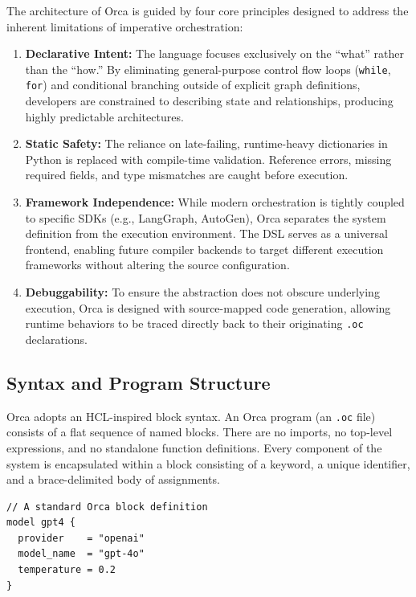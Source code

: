 \documentclass[sigconf,nonacm]{acmart}
\begin{document}
The architecture of Orca is guided by four core principles designed to
address the inherent limitations of imperative orchestration:
\begin{enumerate}[leftmargin=*]
  \item \textbf{Declarative Intent:} The language focuses exclusively on the
        ``what'' rather than the ``how.'' By eliminating general-purpose
        control flow loops (\texttt{while}, \texttt{for}) and conditional
        branching outside of explicit graph definitions, developers are
        constrained to describing state and relationships, producing highly
        predictable architectures.
  \item \textbf{Static Safety:} The reliance on late-failing,
        runtime-heavy dictionaries in Python is replaced with compile-time
        validation. Reference errors, missing required fields, and type
        mismatches are caught before execution.
  \item \textbf{Framework Independence:} While modern orchestration is
        tightly coupled to specific SDKs (e.g., LangGraph, AutoGen), Orca
        separates the system definition from the execution environment. The DSL
        serves as a universal frontend, enabling future compiler backends to
        target different execution frameworks without altering the source
        configuration.
  \item \textbf{Debuggability:} To ensure the abstraction does not obscure
        underlying execution, Orca is designed with source-mapped code
        generation, allowing runtime behaviors to be traced directly back to
        their originating \texttt{.oc} declarations.
\end{enumerate}

\subsection{Syntax and Program Structure}
\label{sec:design:syntax}

Orca adopts an HCL-inspired block syntax. An Orca program (an \texttt{.oc}
file) consists of a flat sequence of named blocks. There are no imports, no
top-level expressions, and no standalone function definitions. Every
component of the system is encapsulated within a block consisting of a
keyword, a unique identifier, and a brace-delimited body of assignments.

\begin{lstlisting}[caption={A standard Orca block definition.},label={lst:orca-block}]
// A standard Orca block definition
model gpt4 {
  provider    = "openai"
  model_name  = "gpt-4o"
  temperature = 0.2
}
\end{lstlisting}
\end{document}

